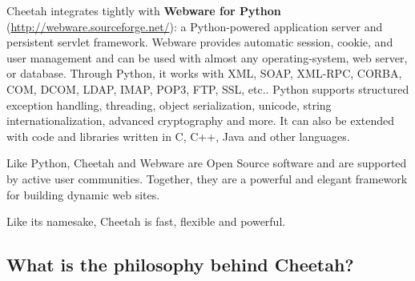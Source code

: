 Cheetah integrates tightly with {\bf Webware for Python}
(\url{http://webware.sourceforge.net/}): a Python-powered application server and
persistent servlet framework. Webware provides automatic session, cookie, and
user management and can be used with almost any operating-system, web server, or
database. Through Python, it works with XML, SOAP, XML-RPC, CORBA, COM, DCOM,
LDAP, IMAP, POP3, FTP, SSL, etc.. Python supports structured exception handling,
threading, object serialization, unicode, string internationalization, advanced
cryptography and more. It can also be extended with code and libraries written
in C, C++, Java and other languages.

Like Python, Cheetah and Webware are Open Source software and are supported by
active user communities.  Together, they are a powerful and elegant framework
for building dynamic web sites. 

Like its namesake, Cheetah is fast, flexible and powerful.


\subsection{What is the philosophy behind Cheetah?}
\label{intro.philosophy}

